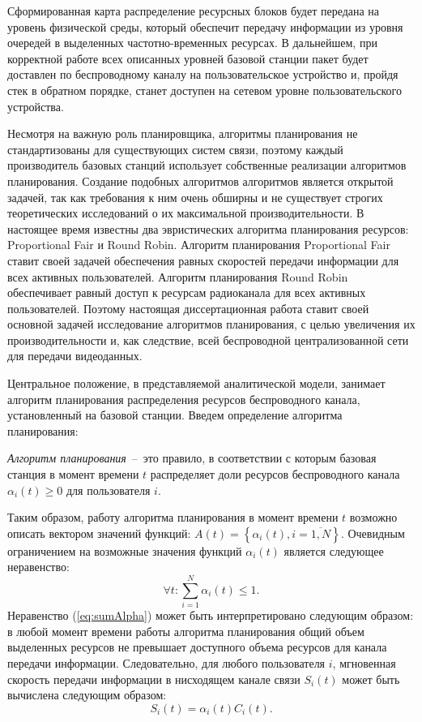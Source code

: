 Сформированная карта распределение ресурсных блоков будет передана на уровень физической среды, который обеспечит передачу информации из уровня очередей в выделенных частотно-временных ресурсах. В дальнейшем, при корректной работе всех описанных уровней базовой станции пакет будет доставлен по беспроводному каналу на пользовательское устройство и, пройдя стек в обратном порядке, станет доступен на сетевом уровне пользовательского устройства.

Несмотря на важную роль планировщика, алгоритмы планирования не стандартизованы для существующих систем связи, поэтому каждый производитель базовых станций использует собственные реализации алгоритмов планирования. Создание подобных алгоритмов алгоритмов является открытой задачей, так как требования к ним очень обширны и не существует строгих теоретических исследований о их максимальной производительности. В настоящее время известны два эвристических алгоритма планирования ресурсов: Proportional Fair и Round Robin. Алгоритм планирования Proportional Fair ставит своей задачей обеспечения равных скоростей передачи информации для всех активных пользователей. Алгоритм планирования Round Robin обеспечивает равный доступ к ресурсам радиоканала для всех активных пользователей. Поэтому настоящая диссертационная работа ставит своей основной задачей исследование алгоритмов планирования, с целью увеличения их производительности и, как следствие, всей беспроводной централизованной сети для передачи видеоданных.

Центральное положение, в представляемой аналитической модели, занимает алгоритм планирования распределения ресурсов беспроводного канала, установленный на базовой станции. Введем определение алгоритма планирования:

\begin{definition}
\label{def:SchedulingAlg}
    \emph{Алгоритм планирования}~--~это правило, в соответствии с которым базовая станция в момент времени $t$ распределяет доли ресурсов беспроводного канала $\alpha_i(t) \geq 0$ для пользователя $i$.
\end{definition}

Таким образом, работу алгоритма планирования в момент времени $t$ возможно описать вектором значений функций: ${A}(t) = \left\{\alpha_{i}(t), i = \overline{1,N}\right\}$. Очевидным ограничением на возможные значения функций $\alpha_i(t)$ является следующее неравенство:
\begin{equation}
\forall t: \sum\limits_{i=1}^{N}\alpha_{i}(t) \leq 1.
\label{eq:sumAlpha}
\end{equation}
Неравенство (\ref{eq:sumAlpha}) может быть интерпретировано следующим образом: в любой момент времени работы алгоритма планирования общий объем выделенных ресурсов не превышает доступного объема ресурсов для канала передачи информации. Следовательно, для любого пользователя $i$, мгновенная скорость передачи информации в нисходящем канале связи $S_i(t)$ может быть вычислена следующим образом:
\begin{equation}
S_i(t) = \alpha_i(t) C_i(t).
\label{eq:MomentRate}
\end{equation}

